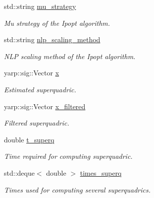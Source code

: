 \begin{DoxyCompactItemize}
\mbox{\label{classSuperqModule_a29a3eb467fb15cb219b43c70a8cfda8a}} 
std\+::string \mbox{\hyperlink{classSuperqModule_a29a3eb467fb15cb219b43c70a8cfda8a}{mu\+\_\+strategy}}
\begin{DoxyCompactList}\small\item\em Mu strategy of the Ipopt algorithm. \end{DoxyCompactList}\item 
\mbox{\label{classSuperqModule_a01f9c7e0ec759b78c782483aaf2f0085}} 
std\+::string \mbox{\hyperlink{classSuperqModule_a01f9c7e0ec759b78c782483aaf2f0085}{nlp\+\_\+scaling\+\_\+method}}
\begin{DoxyCompactList}\small\item\em N\+LP scaling method of the Ipopt algorithm. \end{DoxyCompactList}\item 
\mbox{\label{classSuperqModule_a8b845bdc0c6d35d90141968502ca9d96}} 
yarp\+::sig\+::\+Vector \mbox{\hyperlink{classSuperqModule_a8b845bdc0c6d35d90141968502ca9d96}{x}}
\begin{DoxyCompactList}\small\item\em Estimated superquadric. \end{DoxyCompactList}\item 
\mbox{\label{classSuperqModule_adb96b7bb58edc83b70dcd4781b51130a}} 
yarp\+::sig\+::\+Vector \mbox{\hyperlink{classSuperqModule_adb96b7bb58edc83b70dcd4781b51130a}{x\+\_\+filtered}}
\begin{DoxyCompactList}\small\item\em Filtered superquadric. \end{DoxyCompactList}\item 
\mbox{\label{classSuperqModule_a981bafe724d09df7beb3c10fa96a8980}} 
double \mbox{\hyperlink{classSuperqModule_a981bafe724d09df7beb3c10fa96a8980}{t\+\_\+superq}}
\begin{DoxyCompactList}\small\item\em Time required for computing superquadric. \end{DoxyCompactList}\item 
\mbox{\label{classSuperqModule_a28517e736a16c5e7dfde3bcbec6bf5fd}} 
std\+::deque$<$ double $>$ \mbox{\hyperlink{classSuperqModule_a28517e736a16c5e7dfde3bcbec6bf5fd}{times\+\_\+superq}}
\begin{DoxyCompactList}\small\item\em Times used for computing several superquadrics. \end{DoxyCompactList}\item 

\end{DoxyCompactItemize}
